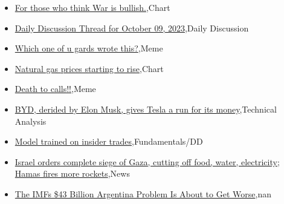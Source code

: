 \documentclass{article}%
\begin{document}
%
\begin{itemize}%
\item%
\href{https://reddit.com/r/wallstreetbets/comments/173oskq/for\_those\_who\_think\_war\_is\_bullish/}{For those who think War is bullish.},Chart%
\item%
\href{https://reddit.com/r/wallstreetbets/comments/173o25v/daily\_discussion\_thread\_for\_october\_09\_2023/}{Daily Discussion Thread for October 09, 2023},Daily Discussion%
\item%
\href{https://reddit.com/r/wallstreetbets/comments/173lqyr/which\_one\_of\_u\_gards\_wrote\_this/}{Which one of u gards wrote this?},Meme%
\item%
\href{https://reddit.com/r/wallstreetbets/comments/173jwjd/natural\_gas\_prices\_starting\_to\_rise/}{Natural gas prices starting to rise},Chart%
\item%
\href{https://reddit.com/r/wallstreetbets/comments/173jkoq/death\_to\_calls/}{Death to calls!!},Meme%
\item%
\href{https://reddit.com/r/StockMarket/comments/173647c/byd\_derided\_by\_elon\_musk\_gives\_tesla\_a\_run\_for/}{BYD, derided by Elon Musk, gives Tesla a run for its money},Technical Analysis%
\item%
\href{https://reddit.com/r/StockMarket/comments/172ppwj/model\_trained\_on\_insider\_trades/}{Model trained on insider trades},Fundamentals/DD%
\item%
\href{https://reddit.com/r/Economics/comments/173pb2j/israel\_orders\_complete\_siege\_of\_gaza\_cutting\_off/}{Israel orders complete siege of Gaza, cutting off food, water, electricity; Hamas fires more rockets},News%
\item%
\href{https://reddit.com/r/Economics/comments/173cw1p/the\_imfs\_43\_billion\_argentina\_problem\_is\_about\_to/}{The IMFs \$43 Billion Argentina Problem Is About to Get Worse},nan%
\end{itemize}%
\end{document}
